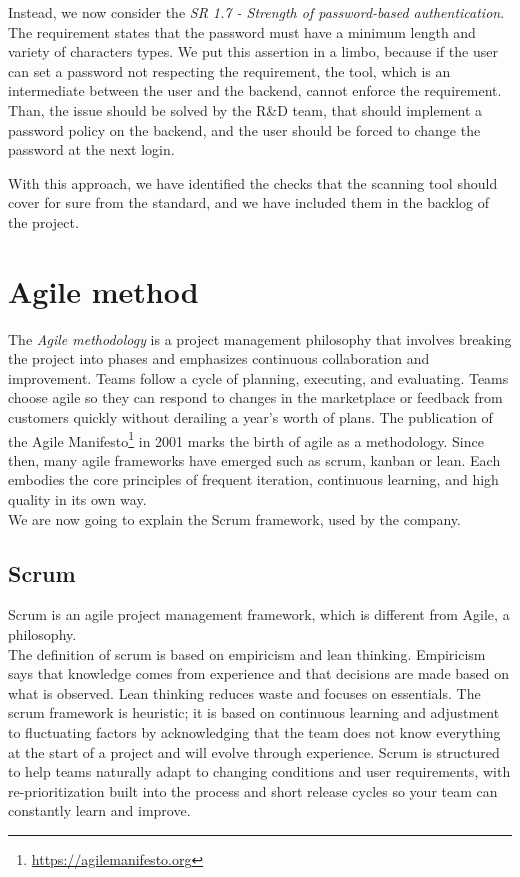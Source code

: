 Instead, we now consider the \textit{SR 1.7 - Strength of password-based authentication}. The requirement states that the password must have a minimum length and variety of characters types. We put this assertion in a limbo, because if the user can set a password not respecting the requirement, the tool, which is an intermediate between the user and the backend, cannot enforce the requirement. Than, the issue should be solved by the R\&D team, that should implement a password policy on the backend, and the user should be forced to change the password at the next login.

With this approach, we have identified the checks that the scanning tool should cover for sure from the standard, and we have included them in the backlog of the project.

\section{Agile method}

The \textit{Agile methodology} is a project management philosophy that involves breaking the project into phases and emphasizes continuous collaboration and improvement. Teams follow a cycle of planning, executing, and evaluating. Teams choose agile so they can respond to changes in the marketplace or feedback from customers quickly without derailing a year's worth of plans. The publication of the Agile Manifesto\footnote{\url{https://agilemanifesto.org}} in 2001 marks the birth of agile as a methodology. Since then, many agile frameworks have emerged such as scrum, kanban or lean. Each embodies the core principles of frequent iteration, continuous learning, and high quality in its own way.~\cite{agile-methodology} \\
We are now going to explain the Scrum framework, used by the company.

\subsection{Scrum}

Scrum is an agile project management framework, which is different from Agile, a philosophy.\\
The definition of scrum is based on empiricism and lean thinking. Empiricism says that knowledge comes from experience and that decisions are made based on what is observed. Lean thinking reduces waste and focuses on essentials. The scrum framework is heuristic; it is based on continuous learning and adjustment to fluctuating factors by acknowledging that the team does not know everything at the start of a project and will evolve through experience. Scrum is structured to help teams naturally adapt to changing conditions and user requirements, with re-prioritization built into the process and short release cycles so your team can constantly learn and improve.~\cite{scrum}

